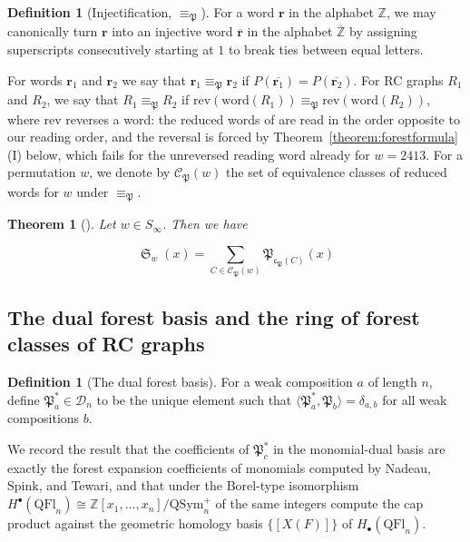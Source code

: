 \documentclass{amsart}
\newtheorem{theorem}{Theorem}[section]
\theoremstyle{definition}
\newtheorem{definition}[lemma]{Definition}
\theoremstyle{remark}
\numberwithin{equation}{subsection}
\DeclareMathOperator{\sch}{\mathfrak{S}}
\newcommand{\dcoma}{\mathcal{D}}
\newcommand{\code}{\mathfrak{c}}
\newcommand{\forest}{\mathfrak{P}}
\begin{document}
\begin{definition}[Injectification, $\equiv_\forest$]\label{definition:forestequiv}
  For a word $\mathbf{r}$ in the alphabet $\mathbb{Z}$, we may canonically turn $\mathbf{r}$ into an injective word $\overline{\mathbf r}$ in the alphabet $\overline{\mathbb{Z}}$ by assigning superscripts consecutively starting at $1$ to break ties between equal letters.

For words $\mathbf{r}_1$ and $\mathbf{r}_2$ we say that $\mathbf{r}_1\equiv_\forest\mathbf{r}_2$ if $P(\overline{\mathbf{r}_1}) = P(\overline{\mathbf{r}_2})$. For RC graphs $R_1$ and $R_2$, we say that $R_1\equiv_\forest R_2$ if $\mathrm{rev}(\mathrm{word}(R_1))\equiv_\forest \mathrm{rev}(\mathrm{word}(R_2))$, where $\mathrm{rev}$ reverses a word: the reduced words of \cite{nadeau2024forest} are read in the order opposite to our reading order, and the reversal is forced by Theorem~\ref{theorem:forestformula}(I) below, which fails for the unreversed reading word already for $w=2413$. For a permutation $w$, we denote by $\mathcal{C}_\forest(w)$ the set of equivalence classes of reduced words for $w$ under $\equiv_\forest$.
\end{definition}

\begin{theorem}[{\cite[Theorem~1.4]{nadeau2024forest}}] \label{theorem:forestforest}
  Let $w\in S_\infty$. Then we have

  $$\sch_w(x) = \sum_{C\in \mathcal{C}_\forest(w)} \forest_{\code_\forest(C)}(x)$$
\end{theorem}


\subsection{The dual forest basis and the ring of forest classes of RC graphs}

\begin{definition}[The dual forest basis]
  For a weak composition $a$ of length $n$, define $\forest_a^*\in \dcoma_n$ to be the unique element such that $\langle \forest_a^*, \forest_b\rangle = \delta_{a,b}$ for all weak compositions $b$.
\end{definition}

We record the result that the coefficients of $\forest^*_c$ in the monomial-dual basis are exactly the forest expansion coefficients of monomials computed by Nadeau, Spink, and Tewari, and that under the Borel-type isomorphism $H^\bullet(\mathrm{QFl}_n)\cong \mathbb{Z}[x_1,\ldots,x_n]/\mathrm{QSym}_n^+$ of \cite{bergeron2025qsymflag} the same integers compute the cap product against the geometric homology basis $\{[X(F)]\}$ of $H_\bullet(\mathrm{QFl}_n)$.
\end{document}
